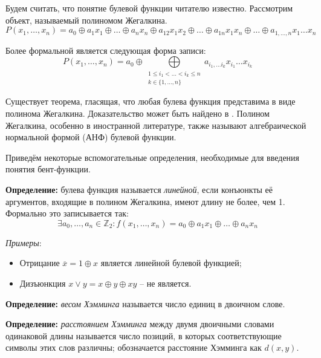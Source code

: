 \documentclass[12pt, a4paper, reqno]{article}
\begin{document}
    Будем считать, что понятие булевой функции читателю известно. Рассмотрим объект, называемый
    полиномом Жегалкина.
    \begin{equation*}
        P(x_1, \ldots, x_n) = a_0 \oplus a_1 x_1 \oplus \ldots \oplus a_n x_n \oplus a_{12} x_1 x_2
        \oplus \ldots \oplus a_{1n} x_1 x_n \oplus \ldots \oplus a_{1,\ldots,n} x_1 \ldots x_n
    \end{equation*}

    Более формальной является следующая форма записи:
    \begin{equation*}
        P(x_1, \ldots, x_n) = a_0 \oplus
        \bigoplus\limits_{\substack{1 \leq i_1 < \ldots < i_k \leq n \\ k \in \{1, \ldots, n\}}}
        a_{i_1, \ldots i_k} x_{i_1} \ldots x_{i_k}
    \end{equation*}

    Существует теорема, гласящая, что любая булева функция представима в виде полинома Жегалкина.
    Доказательство может быть найдено в \cite{rubtsov}. Полином Жегалкина, особенно в иностранной
    литературе, также называют алгебраической нормальной формой (АНФ) булевой функции.

    Приведём некоторые вспомогательные определения, необходимые для введения понятия бент-функции.

    \textbf{Определение:} булева функция называется \textit{линейной}, если конъюнкты её аргументов,
    входящие в полином Жегалкина, имеют длину не более, чем 1. Формально это записывается так:
    \begin{equation*}
        \exists a_0, \ldots, a_n \in \mathbb{Z}_2:
        f(x_1, \ldots, x_n) = a_0 \oplus a_1 x_1 \oplus \ldots \oplus a_n x_n
    \end{equation*}

    \textit{Примеры}:
    \begin{itemize}
        \item Отрицание $\overline{x} = 1 \oplus x$ является линейной булевой функцией;
        \item Дизъюнкция $x \vee y = x \oplus y \oplus xy$ -- не является.
    \end{itemize}

    \textbf{Определение:} \textit{весом Хэмминга} называется число единиц в двоичном слове.

    \textbf{Определение:} \textit{расстоянием Хэмминга} между двумя двоичными словами одинаковой
    длины называется число позиций, в которых соответствующие символы этих слов различны;
    обозначается расстояние Хэмминга как $d(x, y)$.
\end{document}
